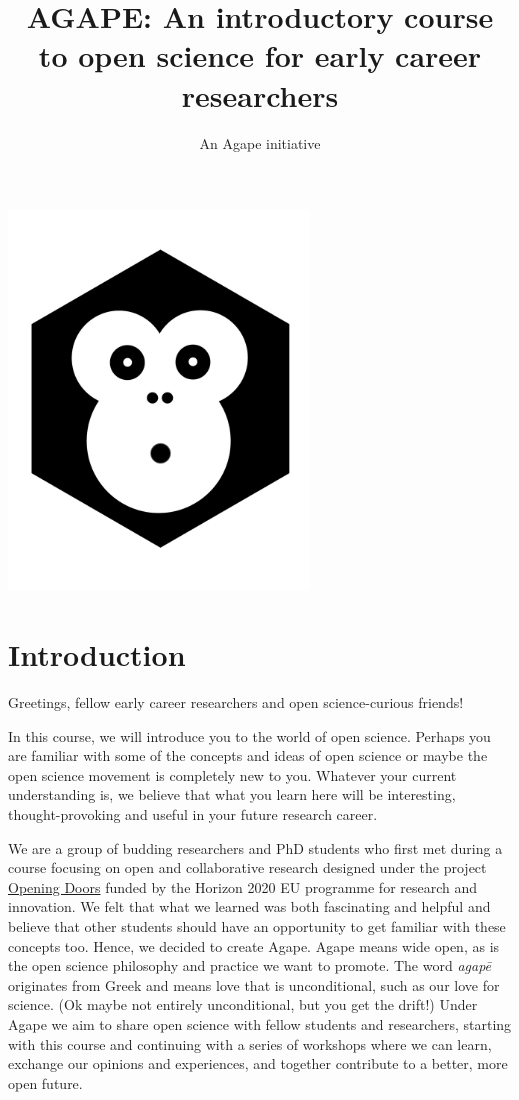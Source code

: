 \documentclass[
]{book}
\title{AGAPE: An introductory course to open science for early career researchers}
\author{An Agape initiative}
\date{}
\begin{document}
\maketitle

{
\setcounter{tocdepth}{1}
\tableofcontents
}
\includegraphics[width=0.6\textwidth,height=\textheight]{images/agapecover.png}

\hypertarget{introduction}{%
\chapter*{Introduction}\label{introduction}}

Greetings, fellow early career researchers and open science-curious friends!

In this course, we will introduce you to the world of open science. Perhaps you are familiar with some of the concepts and ideas of open science or maybe the open science movement is completely new to you. Whatever your current understanding is, we believe that what you learn here will be interesting, thought-provoking and useful in your future research career.

We are a group of budding researchers and PhD students who first met during a course focusing on open and collaborative research designed under the project {\href{https://openingdoors4phd.eu/project.html}{Opening Doors}} funded by the Horizon 2020 EU programme for research and innovation. We felt that what we learned was both fascinating and helpful and believe that other students should have an opportunity to get familiar with these concepts too. Hence, we decided to create Agape. Agape means wide open, as is the open science philosophy and practice we want to promote. The word \emph{agapē} originates from Greek and means love that is unconditional, such as our love for science. (Ok maybe not entirely unconditional, but you get the drift!) Under Agape we aim to share open science with fellow students and researchers, starting with this course and continuing with a series of workshops where we can learn, exchange our opinions and experiences, and together contribute to a better, more open future.
\end{document}

